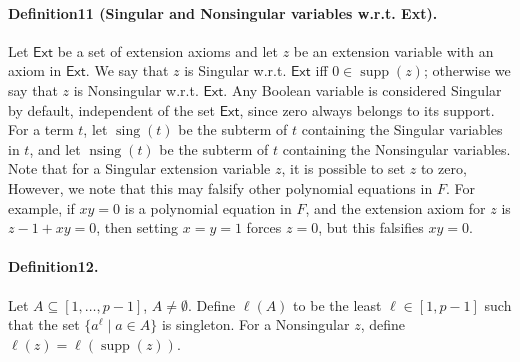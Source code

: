 \documentclass[10pt,a4paper]{article}
\DeclareMathOperator{\supp}{supp}
\DeclareMathOperator{\sing}{sing}
\DeclareMathOperator{\nsing}{nsing}
\begin{document}
\paragraph{Definition11 (Singular and Nonsingular variables w.r.t. Ext).}
Let $\mathsf{Ext}$ be a set of extension axioms and let $z$ be an extension variable with an axiom in $\mathsf{Ext}$. We say that $z$ is Singular w.r.t. $\mathsf{Ext}$ iff $0\in\supp(z)$; otherwise we say that $z$ is Nonsingular w.r.t. $\mathsf{Ext}$. Any Boolean variable is considered Singular by default, independent of the set $\mathsf{Ext}$, since zero always belongs to its support. For a term $t$, let $\sing(t)$ be the subterm of $t$ containing the Singular variables in $t$, and let $\nsing(t)$ be the subterm of $t$ containing the Nonsingular variables.
Note that for a Singular extension variable $z$, it is possible to set $z$ to zero, However, we note that this may falsify other polynomial equations in $F$. For example, if $xy=0$ is a polynomial equation in $F$, and the extension axiom for $z$ is $z-1+xy=0$, then setting $x=y=1$ forces $z=0$, but this falsifies $xy=0$.
\paragraph{Definition12.} Let $A\subseteq[1,\ldots,p-1]$, $A\neq\emptyset$. Define $\ell(A)$ to be the least $\ell\in[1,p-1]$ such that the set $\{a^{\ell}\mid a\in A\}$ is singleton. For a Nonsingular $z$, define $\ell(z)=\ell(\supp(z))$.
\end{document}
